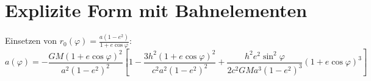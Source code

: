 \section{Explizite Form mit Bahnelementen}
Einsetzen von \( r_0(\varphi) = \frac{a(1-e^2)}{1 + e \cos\varphi} \):
\[ a(\varphi) = -\frac{GM(1 + e \cos\varphi)^2}{a^2(1-e^2)^2} \left[ 
1 - \frac{3h^2(1 + e \cos\varphi)^2}{c^2 a^2(1-e^2)^2} 
+ \frac{h^2 e^2 \sin^2\varphi}{2c^2 GM a^3(1-e^2)^3} (1 + e \cos\varphi)^3 
\right] \]
